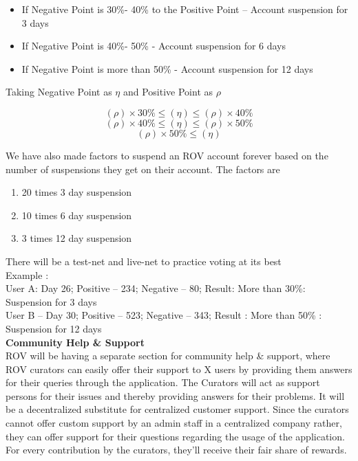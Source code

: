 \documentclass[letterpaper,11pt]{article}
\begin{document}
\begin{itemize}[wide, labelwidth=!, labelindent=0pt]
\item If Negative Point is 30\%- 40\% to the Positive Point – Account suspension for 3 days
\item If Negative Point is 40\%- 50\% - Account suspension for 6 days
\item If Negative Point is more than 50\% - Account suspension for 12 days
\end{itemize} 

Taking Negative Point as $\eta$ and Positive Point as $\rho$

\[(\rho) \times  30\% \leq (\eta) \leq (\rho) \times  40\%\]
\[(\rho) \times  40\% \leq (\eta) \leq (\rho) \times  50\%\]
\[(\rho) \times 50\% \leq (\eta)\]

We have also made factors to suspend an ROV account forever based on the number of suspensions they get on their account. The factors are
\begin{enumerate}[wide, labelwidth=!, labelindent=0pt]
\item 20 times 3 day suspension 
\item 10 times 6 day suspension
\item 3 times 12 day suspension
\end{enumerate}

There will be a test-net and live-net to practice voting at its best\\

Example : \\

User A: Day 26; Positive – 234; Negative – 80; Result: More than 30\%: Suspension for 3 days\\
User B – Day 30; Positive – 523; Negative – 343; Result : More than 50\% : Suspension for 12 days\\


\textbf{Community Help \& Support}\\

ROV will be having a separate section for community help \& support, where ROV curators can easily offer their support to X users by providing them answers for their queries through the application. The Curators will act as support persons for their issues and thereby providing answers for their problems. It will be a decentralized substitute for centralized customer support. Since the curators cannot offer custom support by an admin staff in a centralized company rather, they can offer support for their questions regarding the usage of the application. For every contribution by the curators, they’ll receive their fair share of rewards.\\
\end{document}
